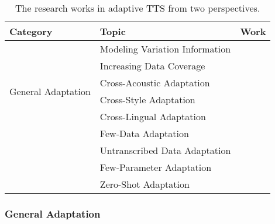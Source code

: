 \documentclass{article}
\begin{document}
\begin{table}[h]
\small
	\caption{The research works in adaptive TTS from two perspectives.}
	\centering
	\begin{tabular}{l | l  l }
		\toprule
		Category & Topic & Work   \\
		\midrule
		\multirow{6}{*}{General Adaptation} & Modeling Variation Information  & \cite{chen2021adaspeech} \\
		& Increasing Data Coverage & \cite{cooper2020can,yang2020towards} \\
        \cmidrule{2-3}
		& Cross-Acoustic Adaptation & \cite{chen2021adaspeech,cong2020data} \\
		& Cross-Style Adaptation & \cite{yan2021adaspeech3,paul2020enhancing,hu2021whispered} \\
		& Cross-Lingual Adaptation & \cite{zhang2019learning,chen2019cross,liu2019cross} \\
		\midrule
		\multirow{4}{*}{Efficient Adaptation} & Few-Data Adaptation & \cite{chen2018sample,arik2018neural,kons2019high,moss2020boffin,zhang2020adadurian,choi2020attentron,chen2021adaspeech,min2021meta} \\
		& Untranscribed Data Adaptation & \cite{yan2021adaspeech,inoue2020semi,luong2020nautilus} \\
	    & Few-Parameter Adaptation  & \cite{arik2018neural,chen2018sample,chen2021adaspeech} \\
		& Zero-Shot Adaptation & \cite{arik2018neural,chen2018sample,jia2018transfer,cooper2020zero} \\
	
		\bottomrule
	\end{tabular}
	\label{tab_voice_adaptation}
\end{table}



\subsubsection{General Adaptation}
\end{document}
